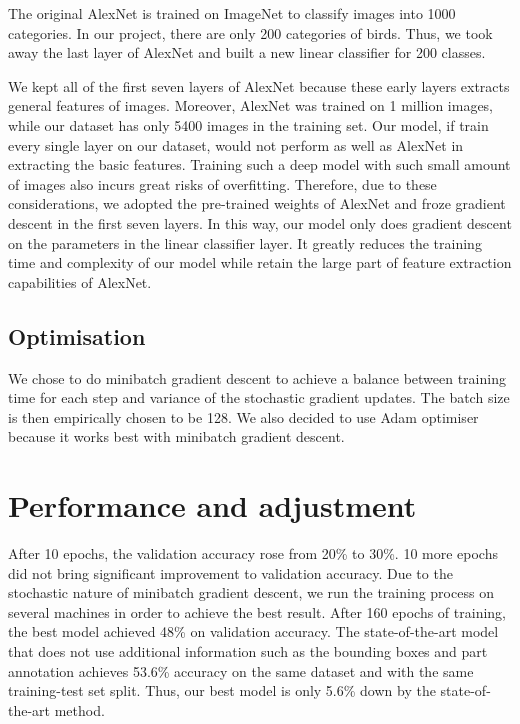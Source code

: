 \documentclass[letterpaper, 12pt]{article}
\begin{document}
The original AlexNet is trained on ImageNet to classify images into 1000 categories.
In our project, there are only 200 categories of birds. Thus, we took away the last layer
of AlexNet and built a new linear classifier for 200 classes.

We kept all of the first seven layers of AlexNet because these early layers extracts general
features of images. Moreover, AlexNet was trained on 1 million images, while our dataset has only 5400
images in the training set. Our model, if train every single layer on our dataset, would not perform as
well as AlexNet in extracting the basic features. Training such a deep model with such small amount of
images also incurs great risks of overfitting. Therefore, due to these considerations, we adopted the
pre-trained weights of AlexNet and froze gradient descent in the first seven layers. In this way, our model
only does gradient descent on the parameters in the linear classifier layer. It greatly reduces the
training time and complexity of our model while retain the large part of feature extraction capabilities of
AlexNet.

\subsection{Optimisation}
We chose to do minibatch gradient descent to achieve a balance between training time for each step and
variance of the stochastic gradient updates. The batch size is then empirically chosen to be 128. We also
decided to use Adam optimiser because it works best with minibatch gradient descent.

\section{Performance and adjustment}
After 10 epochs, the validation accuracy rose from 20\% to 30\%. 10 more epochs did not bring significant
improvement to validation accuracy. Due to the stochastic nature of minibatch gradient descent, we run
the training process on several machines in order to achieve the best result. After 160 epochs of training,
the best model achieved 48\% on validation accuracy. The state-of-the-art model \cite{gavves2015local} that does not use
additional information such as the bounding boxes and part annotation achieves 53.6\% accuracy \cite{krause2015fine}
on the same dataset and with the same training-test set split. Thus, our best model is only 5.6\% down by
the state-of-the-art method.
\end{document}
